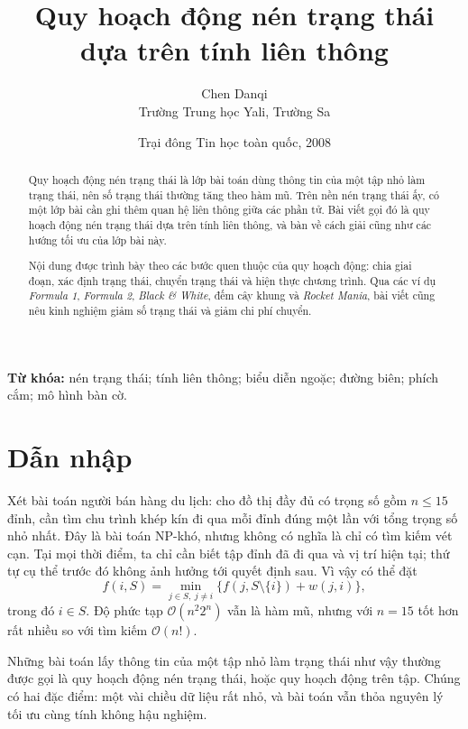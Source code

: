 \documentclass[11pt]{article}
\title{Quy hoạch động nén trạng thái dựa trên tính liên thông}
\author{Chen Danqi\\Trường Trung học Yali, Trường Sa}
\date{Trại đông Tin học toàn quốc, 2008}
\newcommand{\Oh}{\mathcal{O}}
\begin{document}
\maketitle


\renewcommand{\abstractname}{Tóm tắt}
\begin{abstract}
Quy hoạch động nén trạng thái là lớp bài toán dùng thông tin của một tập nhỏ
làm trạng thái, nên số trạng thái thường tăng theo hàm mũ. Trên nền nén trạng
thái ấy, có một lớp bài cần ghi thêm quan hệ liên thông giữa các phần tử. Bài
viết gọi đó là quy hoạch động nén trạng thái dựa trên tính liên thông, và bàn
về cách giải cũng như các hướng tối ưu của lớp bài này.

Nội dung được trình bày theo các bước quen thuộc của quy hoạch động: chia giai
đoạn, xác định trạng thái, chuyển trạng thái và hiện thực chương trình. Qua các
ví dụ \textit{Formula 1}, \textit{Formula 2}, \textit{Black \& White}, đếm cây
khung và \textit{Rocket Mania}, bài viết cũng nêu kinh nghiệm giảm số trạng
thái và giảm chi phí chuyển.
\end{abstract}

\noindent\textbf{Từ khóa:} nén trạng thái; tính liên thông; biểu diễn ngoặc;
đường biên; phích cắm; mô hình bàn cờ.

\section{Dẫn nhập}

Xét bài toán người bán hàng du lịch: cho đồ thị đầy đủ có trọng số gồm
\(n\le 15\) đỉnh, cần tìm chu trình khép kín đi qua mỗi đỉnh đúng một lần với
tổng trọng số nhỏ nhất. Đây là bài toán NP-khó, nhưng không có nghĩa là chỉ có
tìm kiếm vét cạn. Tại mọi thời điểm, ta chỉ cần biết tập đỉnh đã đi qua và vị
trí hiện tại; thứ tự cụ thể trước đó không ảnh hưởng tới quyết định sau. Vì
vậy có thể đặt
\[
  f(i,S)=\min_{j\in S,\ j\ne i}\{f(j,S\setminus\{i\})+w(j,i)\},
\]
trong đó \(i\in S\). Độ phức tạp \(\Oh(n^2 2^n)\) vẫn là hàm mũ, nhưng với
\(n=15\) tốt hơn rất nhiều so với tìm kiếm \(\Oh(n!)\).

Những bài toán lấy thông tin của một tập nhỏ làm trạng thái như vậy thường
được gọi là quy hoạch động nén trạng thái, hoặc quy hoạch động trên tập. Chúng
có hai đặc điểm: một vài chiều dữ liệu rất nhỏ, và bài toán vẫn thỏa nguyên lý
tối ưu cùng tính không hậu nghiệm.
\end{document}
